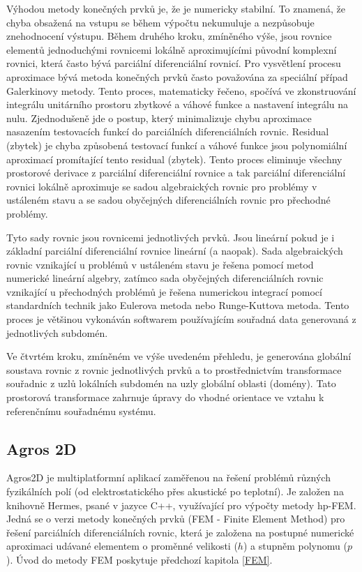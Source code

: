 \documentclass[12pt,a4paper,oneside]{article}
\numberwithin{equation}{section} %
\numberwithin{figure}{section} %
\numberwithin{table}{section} %
\begin{document}
Výhodou metody konečných prvků je, že je numericky stabilní. To znamená, že chyba obsažená na vstupu se během výpočtu nekumuluje a nezpůsobuje znehodnocení výstupu. Během druhého kroku, zmíněného výše, jsou rovnice elementů jednoduchými rovnicemi lokálně aproximujícími původní komplexní rovnici, která často bývá parciální diferenciální rovnicí. Pro vysvětlení procesu aproximace bývá metoda konečných prvků často považována za speciální případ Galerkinovy metody. Tento proces, matematicky řečeno, spočívá ve zkonstruování integrálu unitárního prostoru zbytkové a váhové funkce a nastavení integrálu na nulu. Zjednodušeně jde o postup, který minimalizuje chybu aproximace nasazením testovacích funkcí do parciálních diferenciálních rovnic. Residual (zbytek) je chyba způsobená testovací funkcí a váhové funkce jsou polynomiální aproximací promítající tento residual (zbytek). Tento proces eliminuje všechny prostorové derivace z parciální diferenciální rovnice a tak parciální diferenciální rovnici lokálně aproximuje se sadou algebraických rovnic pro problémy v ustáleném stavu a se sadou obyčejných diferenciálních rovnic pro přechodné problémy.

Tyto sady rovnic jsou rovnicemi jednotlivých prvků. Jsou lineární pokud je i základní parciální diferenciální rovnice lineární (a naopak). Sada algebraických rovnic vznikající u problémů v ustáleném stavu je řešena pomocí metod numerické lineární algebry, zatímco sada obyčejných diferenciálních rovnic vznikající u přechodných problémů je řešena numerickou integrací pomocí standardních technik jako Eulerova metoda nebo Runge-Kuttova metoda. Tento proces je většinou vykonáván softwarem používajícím souřadná data generovaná z jednotlivých subdomén.

Ve čtvrtém kroku, zmíněném ve výše uvedeném přehledu, je generována globální soustava rovnic z rovnic jednotlivých prvků a to prostřednictvím transformace souřadnic z uzlů lokálních subdomén na uzly globální oblasti (domény). Tato prostorová transformace zahrnuje úpravy do vhodné orientace ve vztahu k referenčnímu souřadnému systému. \cite{FEM}



\subsection{Agros 2D}
Agros2D je multiplatformní aplikací zaměřenou na řešení problémů různých fyzikálních polí (od elektrostatického přes akustické po teplotní). Je založen na knihovně Hermes, psané v jazyce C++, využívající pro výpočty metody hp-FEM. Jedná se o verzi metody konečných prvků (FEM - Finite Element Method) pro řešení parciálních diferenciálních rovnic, která je založena na postupné numerické aproximaci udávané elementem o proměnné velikosti ($h$) a stupněm polynomu ($p$). Úvod do metody FEM poskytuje předchozí kapitola \ref{FEM}. \cite{hpFEM}
\end{document}
